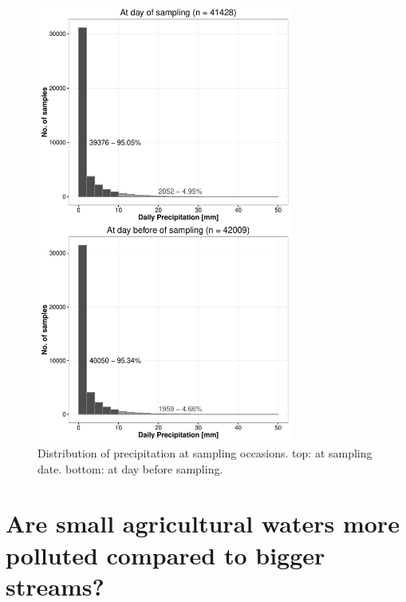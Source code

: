 \documentclass[pdftex,a4paper]{scrreprt}
\begin{document}
\begin{figure}[h]
	\centering
	\includegraphics[width = 0.75\textwidth]{precip}
	\caption{Distribution of precipitation at sampling occasions. top: at sampling date. bottom: at day before sampling.}
	\label{fig:precip}
\end{figure}


\chapter{Are small agricultural waters more polluted compared to bigger streams?}
\end{document}
